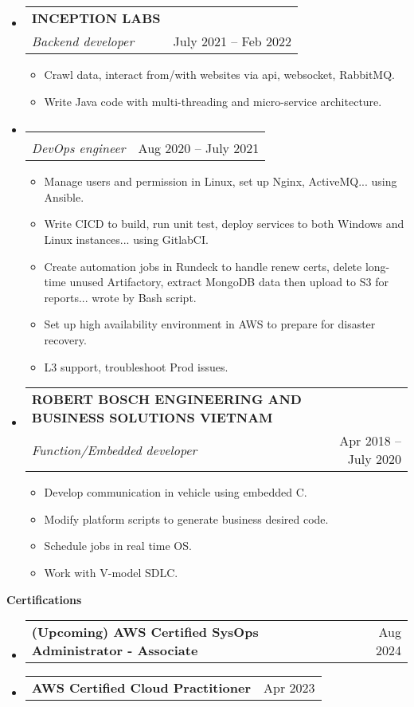 \documentclass[letterpaper,12pt]{article}[leftmargin=*]
\makeatletter
\def \entryspacing {5pt}
\renewcommand{\section}[2]{\vspace{5pt}
  \colorbox{secondary}{\color{white}\raggedbottom\normalsize\textbf{{#1}{\hspace{7pt}#2}}}
}
\newcommand{\resumeEntryStart}{\begin{itemize}[leftmargin=2.5mm]}
\newcommand{\resumeEntryEnd}{\end{itemize}\vspace{\entryspacing}}
\newcommand{\resumeItemListStart}{\begin{itemize}[leftmargin=4.5mm]}
\newcommand{\resumeItemListEnd}{\end{itemize}}
\newcommand{\resumeItem}[1]{
  \item\small{
    {#1 \vspace{-2pt}}
  }
}
\newcommand{\resumeEntryTSDL}[4]{
  \vspace{-1pt}\item[]
    \begin{tabularx}{0.97\textwidth}{X@{\hspace{60pt}}r}
      \textbf{\color{primary}#1} & {\firabook\color{accent}\small#2} \\
      \textit{\color{accent}\small#3} & {\firabook\color{accent}\small#4} \\
    \end{tabularx}\vspace{-6pt}
}
\newcommand{\resumeEntryTD}[2]{
  \vspace{1pt}\item[]
    \begin{tabularx}{0.97\textwidth}{X@{\hspace{60pt}}r}
      \textbf{\color{primary}#1} & {\firabook\color{accent}\small#2} \\
    \end{tabularx}\vspace{-6pt}
}
\makeatother
\begin{document}
  \resumeEntryStart
    \resumeEntryTSDL
      {INCEPTION LABS}{}
      {Backend developer}{July 2021 -- Feb 2022}
    \resumeItemListStart
      \resumeItem {Crawl data, interact from/with websites via api, websocket, RabbitMQ.}
      \resumeItem {Write Java code with multi-threading and micro-service architecture.}
    \resumeItemListEnd

    \vspace{-15pt}\resumeEntryTSDL
      {}{}
      {DevOps engineer}{Aug 2020 -- July 2021}
    \resumeItemListStart
      \resumeItem {Manage users and permission in Linux, set up Nginx, ActiveMQ... using Ansible.}
      \resumeItem {Write CICD to build, run unit test, deploy services to both Windows and Linux instances... using GitlabCI.}
      \resumeItem {Create automation jobs in Rundeck to handle renew certs, delete long-time unused Artifactory, extract MongoDB data then upload to S3 for reports... wrote by Bash script.}
      \resumeItem {Set up high availability environment in AWS to prepare for disaster recovery.}
      \resumeItem {L3 support, troubleshoot Prod issues.}
    \resumeItemListEnd
  \resumeEntryEnd


  \resumeEntryStart
    \resumeEntryTSDL
      {ROBERT BOSCH ENGINEERING AND BUSINESS SOLUTIONS VIETNAM}{}
      {Function/Embedded developer}{Apr 2018 -- July 2020}
    \resumeItemListStart
      \resumeItem {Develop communication in vehicle using embedded C.}
      \vspace{1pt}\small{
      }\vspace{-1pt}
      \resumeItem {Modify platform scripts to generate business desired code.}
      \resumeItem {Schedule jobs in real time OS.}
      \resumeItem {Work with V-model SDLC.}
    \resumeItemListEnd
  \resumeEntryEnd

\section{\faAward}{Certifications}
  \resumeEntryStart
    \resumeEntryTD
      {(Upcoming) AWS Certified SysOps Administrator - Associate}{Aug 2024}
  \resumeEntryEnd
  \vspace{-20pt}
  
  \resumeEntryStart
    \resumeEntryTD
      {AWS Certified Cloud Practitioner}{Apr 2023}
  \resumeEntryEnd
  \vspace{-20pt}
  
\end{document}
